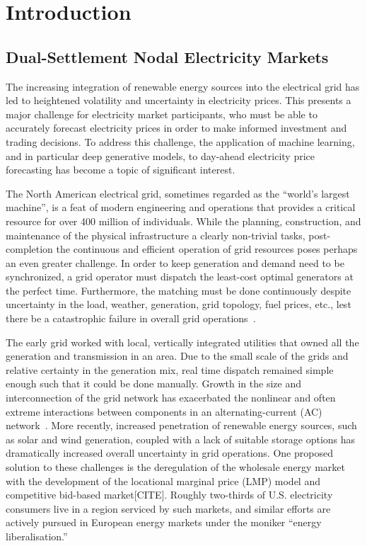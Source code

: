 \chapter{Introduction}\label{ch:intro}

\section{Dual-Settlement Nodal Electricity Markets}\label{sec:dual-settlement-nodal-electricity-markets}

The increasing integration of renewable energy sources into the electrical grid has led to heightened volatility and
uncertainty in electricity prices.
This presents a major challenge for electricity market participants, who must be able
to accurately forecast electricity prices in order to make informed investment and trading decisions.
To address this challenge, the application of machine learning, and in particular deep generative models, to
day-ahead electricity price forecasting has become a topic of significant interest.

The North American electrical grid, sometimes regarded as the ``world's largest machine'', is a feat of modern
engineering and operations that provides a critical resource for over 400 million of individuals.
While the planning, construction, and maintenance of the physical infrastructure a clearly non-trivial tasks,
post-completion the continuous and efficient operation of grid resources poses perhaps an even greater challenge.
In order to keep generation and demand need to be synchronized, a grid operator must dispatch the least-cost optimal
generators at the perfect time.
Furthermore, the matching must be done continuously despite uncertainty in the load, weather, generation,
grid topology, fuel prices, etc., lest there be a catastrophic failure in overall grid operations~\cite{ercotfail}.

The early grid worked with local, vertically integrated utilities that owned all the generation and transmission in
an area.
Due to the small scale of the grids and relative certainty in the generation mix, real time dispatch remained simple
enough such that it could be done manually.
Growth in the size and interconnection of the grid network has exacerbated the nonlinear and often extreme interactions
between components in an alternating-current (AC) network~\cite{grid_sensitivity}.
More recently, increased penetration of renewable energy sources, such as solar and wind generation, coupled
with a lack of suitable storage options has dramatically increased overall uncertainty in grid operations.
One proposed solution to these challenges is the deregulation of the wholesale energy market with the development of
the locational marginal price (LMP) model and competitive bid-based market[CITE].
Roughly two-thirds of U.S. electricity consumers live in a region serviced by such markets, and similar efforts are
actively pursued in European energy markets under the moniker ``energy liberalisation.''

